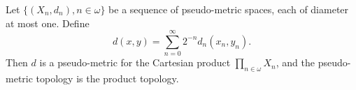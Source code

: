 Let $\{(X_n, d_n), n \in \omega\}$ be a sequence of pseudo-metric spaces, each of diameter at most one. Define
$$d(x,y) = \sum_{n=0}^\infty 2^{-n} d_n(x_n, y_n).$$
Then $d$ is a pseudo-metric for the Cartesian product $\prod_{n \in \omega} X_n$, and the pseudo-metric topology is the product topology.
